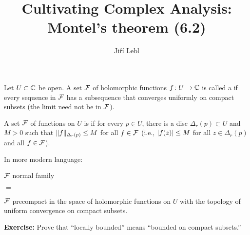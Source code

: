 \documentclass[10pt,aspectratio=169]{beamer}
\author{Ji\v{r}\'i Lebl}
\institute[OSU]{%
Departemento pri Matematiko de Oklahoma {\^S}tata Universitato}
\title{Cultivating Complex Analysis:\\%
Montel's theorem (6.2)}
\date{}
\begin{document}
\begin{frame}
\titlepage
\end{frame}

\begin{frame}
\begin{definition}
Let $U \subset {\mathbb{C}}$ be open.
A set ${\mathcal{F}}$ of holomorphic functions $f \colon U \to {\mathbb{C}}$ is called a
\emph{} if every sequence in ${\mathcal{F}}$ has a subsequence
that converges uniformly on compact subsets (the limit need not be in ${\mathcal{F}}$).

\medskip
\pause

A set ${\mathcal{F}}$ of functions on $U$ is \emph{}
if for every $p \in U$, there is a disc $\Delta_r(p) \subset U$ and $M > 0$
such that 
$\lVert {f} \rVert_{\Delta_r(p)} \leq M$ for all $f \in {\mathcal{F}}$
\pause \quad (i.e., $\lvert {f(z)} \rvert \leq M$ for all $z \in \Delta_r(p)$ and all $f \in {\mathcal{F}}$).
\end{definition}

\pause

In more modern language:

\medskip

${\mathcal{F}}$ normal family

\qquad $=$

${\mathcal{F}}$ precompact in the space
of holomorphic functions on $U$
with the topology of uniform convergence on compact subsets.

\medskip
\pause

\textbf{Exercise:}
Prove that ``locally bounded'' means ``bounded on compact subsets.''
\end{frame}
\end{document}
